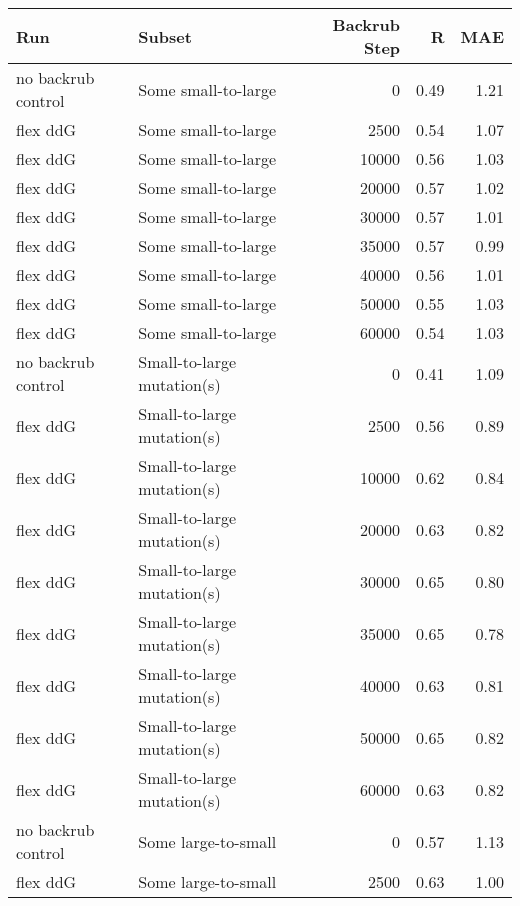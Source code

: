 \begin{table}
\begin{tabular}{llrrr}
\toprule
                Run &                      Subset &  Backrub Step &    R &  MAE \\
\midrule
 no backrub control &         Some small-to-large &             0 & 0.49 & 1.21 \\
           flex ddG &         Some small-to-large &          2500 & 0.54 & 1.07 \\
           flex ddG &         Some small-to-large &         10000 & 0.56 & 1.03 \\
           flex ddG &         Some small-to-large &         20000 & 0.57 & 1.02 \\
           flex ddG &         Some small-to-large &         30000 & 0.57 & 1.01 \\
           flex ddG &         Some small-to-large &         35000 & 0.57 & 0.99 \\
           flex ddG &         Some small-to-large &         40000 & 0.56 & 1.01 \\
           flex ddG &         Some small-to-large &         50000 & 0.55 & 1.03 \\
           flex ddG &         Some small-to-large &         60000 & 0.54 & 1.03 \\
 no backrub control &  Small-to-large mutation(s) &             0 & 0.41 & 1.09 \\
           flex ddG &  Small-to-large mutation(s) &          2500 & 0.56 & 0.89 \\
           flex ddG &  Small-to-large mutation(s) &         10000 & 0.62 & 0.84 \\
           flex ddG &  Small-to-large mutation(s) &         20000 & 0.63 & 0.82 \\
           flex ddG &  Small-to-large mutation(s) &         30000 & 0.65 & 0.80 \\
           flex ddG &  Small-to-large mutation(s) &         35000 & 0.65 & 0.78 \\
           flex ddG &  Small-to-large mutation(s) &         40000 & 0.63 & 0.81 \\
           flex ddG &  Small-to-large mutation(s) &         50000 & 0.65 & 0.82 \\
           flex ddG &  Small-to-large mutation(s) &         60000 & 0.63 & 0.82 \\
 no backrub control &         Some large-to-small &             0 & 0.57 & 1.13 \\
           flex ddG &         Some large-to-small &          2500 & 0.63 & 1.00 \\

\end{tabular}
\end{table}
